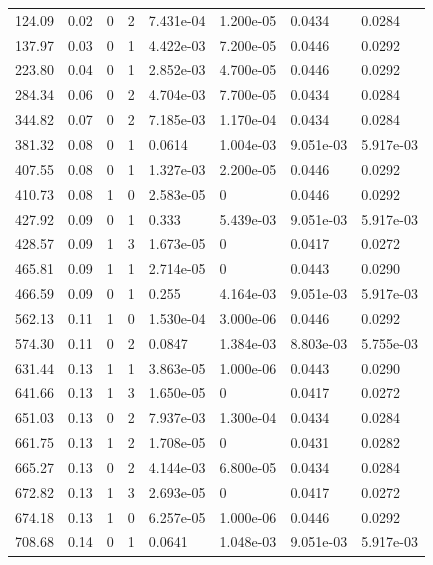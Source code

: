 \documentclass[preview]{standalone}
\begin{document}
{{\begin{tabular}{L{1.2cm}C{1.2cm} C{0.3cm}C{0.5cm} C{1.4cm}C{1.4cm} C{1.4cm}C{1.4cm}}
  124.09  &  0.02  & 0     &  2 &  7.431e-04  & 1.200e-05  & 0.0434 &  0.0284   \\ 
  137.97  &  0.03  & 0     &  1 &  4.422e-03  & 7.200e-05  & 0.0446 &  0.0292   \\ 
  223.80  &  0.04  & 0     &  1 &  2.852e-03  & 4.700e-05  & 0.0446 &  0.0292   \\ 
  284.34  &  0.06  & 0     &  2 &  4.704e-03  & 7.700e-05  & 0.0434 &  0.0284   \\ 
  344.82  &  0.07  & 0     &  2 &  7.185e-03  & 1.170e-04  & 0.0434 &  0.0284   \\ 
  381.32  &  0.08  & 0     &  1 &  0.0614  & 1.004e-03  & 9.051e-03 &  5.917e-03   \\ 
  407.55  &  0.08  & 0     &  1 &  1.327e-03  & 2.200e-05  & 0.0446 &  0.0292   \\ 
  410.73  &  0.08  & 1     &  0 &  2.583e-05  & 0  & 0.0446 &  0.0292   \\ 
  427.92  &  0.09  & 0     &  1 &  0.333  & 5.439e-03  & 9.051e-03 &  5.917e-03   \\ 
  428.57  &  0.09  & 1     &  3 &  1.673e-05  & 0  & 0.0417 &  0.0272   \\ 
  465.81  &  0.09  & 1     &  1 &  2.714e-05  & 0  & 0.0443 &  0.0290   \\ 
  466.59  &  0.09  & 0     &  1 &  0.255  & 4.164e-03  & 9.051e-03 &  5.917e-03   \\ 
  562.13  &  0.11  & 1     &  0 &  1.530e-04  & 3.000e-06  & 0.0446 &  0.0292   \\ 
  574.30  &  0.11  & 0     &  2 &  0.0847  & 1.384e-03  & 8.803e-03 &  5.755e-03   \\ 
  631.44  &  0.13  & 1     &  1 &  3.863e-05  & 1.000e-06  & 0.0443 &  0.0290   \\ 
  641.66  &  0.13  & 1     &  3 &  1.650e-05  & 0  & 0.0417 &  0.0272   \\ 
  651.03  &  0.13  & 0     &  2 &  7.937e-03  & 1.300e-04  & 0.0434 &  0.0284   \\ 
  661.75  &  0.13  & 1     &  2 &  1.708e-05  & 0  & 0.0431 &  0.0282   \\ 
  665.27  &  0.13  & 0     &  2 &  4.144e-03  & 6.800e-05  & 0.0434 &  0.0284   \\ 
  672.82  &  0.13  & 1     &  3 &  2.693e-05  & 0  & 0.0417 &  0.0272   \\ 
  674.18  &  0.13  & 1     &  0 &  6.257e-05  & 1.000e-06  & 0.0446 &  0.0292   \\ 
  708.68  &  0.14  & 0     &  1 &  0.0641  & 1.048e-03  & 9.051e-03 &  5.917e-03   \\ 

\end{tabular}}}
\end{document}
